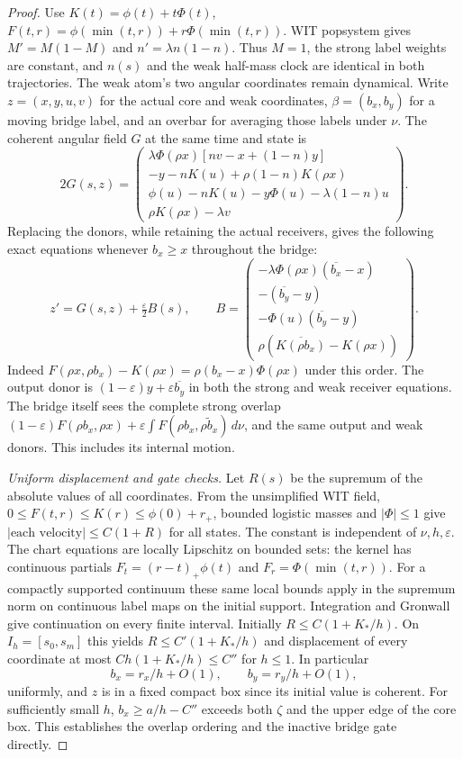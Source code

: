 \documentclass[11pt]{article}
\newcommand{\dd}{\,d}
\begin{document}
\begin{proof}
Use $K(t)=\phi(t)+t\Phi(t)$, $F(t,r)=\phi(\min(t,r))+r\Phi(\min(t,r))$.
WIT popsystem gives $M'=M(1-M)$ and $n'=\lambda n(1-n)$. Thus
$M=1$, the strong label weights are constant, and $n(s)$ and the
weak half-mass clock are identical in both trajectories. The weak atom's
two angular coordinates remain dynamical. Write $z=(x,y,u,v)$ for
the actual core and weak coordinates, $\beta=(b_x,b_y)$ for a moving
bridge label, and an overbar for averaging those labels under $\nu$.
The coherent angular field $G$ at the same time and state is
\[
 2G(s,z)=\begin{pmatrix}
 \lambda\Phi(\rho x)[nv-x+(1-n)y]\\
 -y-nK(u)+\rho(1-n)K(\rho x)\\
 \phi(u)-nK(u)-y\Phi(u)-\lambda(1-n)u\\
 \rho K(\rho x)-\lambda v
 \end{pmatrix}.
\]
Replacing the donors, while retaining the actual receivers, gives
the following exact equations whenever $b_x\ge x$ throughout the bridge:
\begin{equation}\label{an04mpbv1:field}
 z'=G(s,z)+\tfrac{\varepsilon}{2}B(s),\qquad
 B=\begin{pmatrix}
 -\lambda\Phi(\rho x)(\overline{b_x}-x)\\
 -(\overline{b_y}-y)\\
 -\Phi(u)(\overline{b_y}-y)\\
 \rho(\overline{K(\rho b_x)}-K(\rho x))
 \end{pmatrix}.
\end{equation}
Indeed $F(\rho x,\rho b_x)-K(\rho x)=\rho(b_x-x)\Phi(\rho x)$
under this order. The output donor is $(1-\varepsilon)y+
\varepsilon\overline{b_y}$ in both the strong and weak receiver
equations. The bridge itself sees the complete strong overlap
$(1-\varepsilon)F(\rho b_x,\rho x)+
\varepsilon\int F(\rho b_x,\rho\widetilde b_x)\dd\nu$,
and the same output and weak donors. This includes its internal motion.

\emph{Uniform displacement and gate checks.}
Let $R(s)$ be the supremum of the absolute values of all coordinates.
From the unsimplified WIT field, $0\le F(t,r)\le K(r)\le\phi(0)+r_+$,
bounded logistic masses and $|\Phi|\le1$ give
$|\text{each velocity}|\le C(1+R)$ for all states. The constant
is independent of $\nu,h,\varepsilon$. The chart equations are locally
Lipschitz on bounded sets: the kernel has continuous partials
$F_t=(r-t)_+\phi(t)$ and $F_r=\Phi(\min(t,r))$. For a compactly
supported continuum these same local bounds apply in the supremum
norm on continuous label maps on the initial support. Integration
and Gronwall give continuation on every finite interval.
Initially $R\le C(1+K_*/h)$. On $I_h=[s_0,s_m]$ this yields
$R\le C'(1+K_*/h)$ and displacement of every coordinate at most
$Ch(1+K_*/h)\le C''$ for $h\le1$. In particular
\[
 b_x=r_x/h+O(1),\qquad b_y=r_y/h+O(1),
\]
uniformly, and $z$ is in a fixed compact box since its initial
value is coherent. For sufficiently small $h$, $b_x\ge a/h-C''$
exceeds both $\zeta$ and the upper edge of the core box. This
establishes the overlap ordering and the inactive bridge gate directly.


\end{proof}
\end{document}
